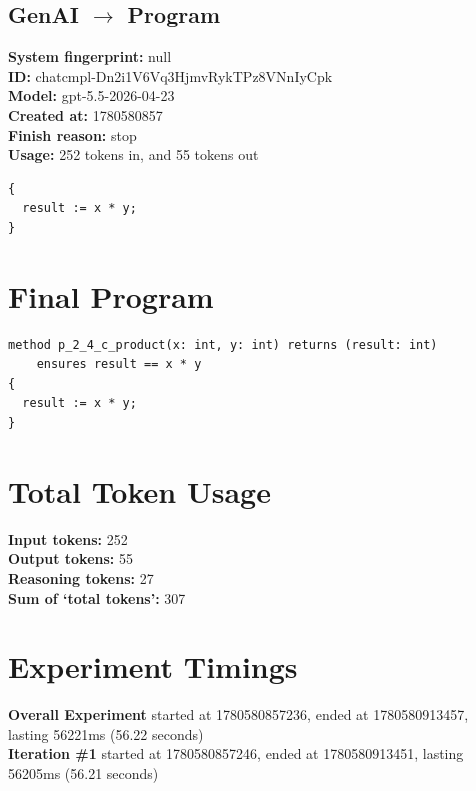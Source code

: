 \documentclass{article}
\begin{document}
\subsection*{GenAI $\rightarrow$ Program}
\textbf{System fingerprint: }null
\\\textbf{ID: }chatcmpl-Dn2i1V6Vq3HjmvRykTPz8VNnIyCpk
\\\textbf{Model: }gpt-5.5-2026-04-23
\\\textbf{Created at: }1780580857
\\\textbf{Finish reason: }stop
\\\textbf{Usage: }252 tokens in, and 55 tokens out
\begin{lstlisting}
{
  result := x * y;
}
\end{lstlisting}
\section*{Final Program}
\begin{lstlisting}
method p_2_4_c_product(x: int, y: int) returns (result: int)
	ensures result == x * y
{
  result := x * y;
}
\end{lstlisting}
\section*{Total Token Usage}
\textbf{Input tokens: }252
\\\textbf{Output tokens: }55
\\\textbf{Reasoning tokens: }27
\\\textbf{Sum of `total tokens': }307
\section*{Experiment Timings}
\textbf{Overall Experiment} started at 1780580857236, ended at 1780580913457, lasting 56221ms (56.22 seconds)
\\\textbf{Iteration \#1} started at 1780580857246, ended at 1780580913451, lasting 56205ms (56.21 seconds)
\end{document}
